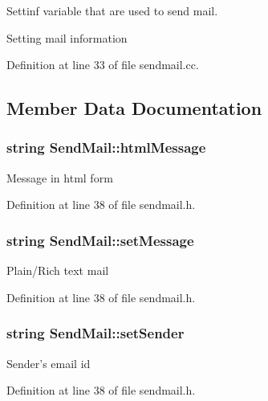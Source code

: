 Settinf variable that are used to send mail. 

Setting mail information 

Definition at line 33 of file sendmail.\-cc.



\subsection{Member Data Documentation}
\hypertarget{classSendMail_a962ca34d61eab5c0f8c47e760cce4a53}{
\subsubsection[{html\-Message}]{\setlength{\rightskip}{0pt plus 5cm}string Send\-Mail\-::html\-Message\hspace{0.3cm}{\ttfamily [protected]}}}\label{classSendMail_a962ca34d61eab5c0f8c47e760cce4a53}
Message in html form 

Definition at line 38 of file sendmail.\-h.

\hypertarget{classSendMail_ac4e386f1e7775484429f7b01ef1623a3}{
\subsubsection[{set\-Message}]{\setlength{\rightskip}{0pt plus 5cm}string Send\-Mail\-::set\-Message\hspace{0.3cm}{\ttfamily [protected]}}}\label{classSendMail_ac4e386f1e7775484429f7b01ef1623a3}
Plain/\-Rich text mail 

Definition at line 38 of file sendmail.\-h.

\hypertarget{classSendMail_ae6776dfd1b92b97837f25259f7b57d2f}{
\subsubsection[{set\-Sender}]{\setlength{\rightskip}{0pt plus 5cm}string Send\-Mail\-::set\-Sender\hspace{0.3cm}{\ttfamily [protected]}}}\label{classSendMail_ae6776dfd1b92b97837f25259f7b57d2f}
Sender's email id 

Definition at line 38 of file sendmail.\-h.


